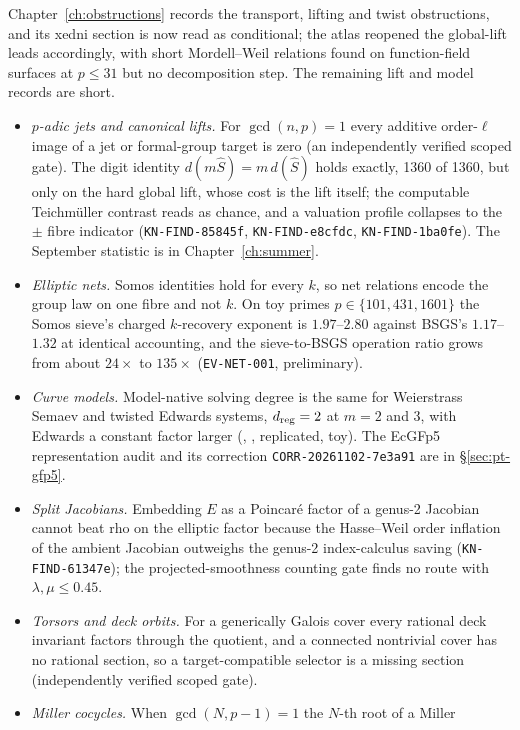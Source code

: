 Chapter~\ref{ch:obstructions} records the transport, lifting and twist
obstructions, and its xedni section is now read as conditional; the atlas
reopened the global-lift leads accordingly, with short Mordell--Weil
relations found on function-field surfaces at $p\le31$ but no decomposition
step. The remaining lift and model records are short.
\begin{itemize}
\item \emph{$p$-adic jets and canonical lifts.} For $\gcd(n,p)=1$ every additive
  order-$\ell$ image of a jet or formal-group target is zero (an independently
  verified scoped gate). The digit identity $d(m\hat S)=m\,d(\hat S)$ holds exactly,
  1360 of 1360, but only on the hard global lift, whose cost is the lift itself;
  the computable Teichm\"uller contrast reads as chance, and a valuation profile
  collapses to the $\pm$ fibre indicator (\texttt{KN-FIND-85845f},
  \texttt{KN-FIND-e8cfdc}, \texttt{KN-FIND-1ba0fe}). The September statistic is in
  Chapter~\ref{ch:summer}.
\item \emph{Elliptic nets.} Somos identities hold for every $k$, so net
  relations encode the group law on one fibre and not $k$. On toy primes
  $p\in\{101,431,1601\}$ the Somos sieve's charged $k$-recovery exponent is
  $1.97$--$2.80$ against BSGS's $1.17$--$1.32$ at identical accounting, and the
  sieve-to-BSGS operation ratio grows from about $24\times$ to $135\times$
  (\texttt{EV-NET-001}, preliminary).
\item \emph{Curve models.} Model-native solving degree is the same for
  Weierstrass Semaev and twisted Edwards systems, $d_{\rm reg}=2$ at $m=2$ and 3,
  with Edwards a constant factor larger (,
  , replicated, toy). The EcGFp5 representation audit and
  its correction \texttt{CORR-20261102-7e3a91} are in \S\ref{sec:pt-gfp5}.
\item \emph{Split Jacobians.} Embedding $E$ as a Poincar\'e factor of a genus-2
  Jacobian cannot beat rho on the elliptic factor because the Hasse--Weil order
  inflation of the ambient Jacobian outweighs the genus-2 index-calculus saving
  (\texttt{KN-FIND-61347e}); the projected-smoothness counting gate finds no
  route with $\lambda,\mu\le0.45$.
\item \emph{Torsors and deck orbits.} For a generically Galois cover every
  rational deck invariant factors through the quotient, and a connected
  nontrivial cover has no rational section, so a target-compatible selector is
  a missing section (independently verified scoped gate).
\item \emph{Miller cocycles.} When $\gcd(N,p-1)=1$ the $N$-th root of a Miller

\end{itemize}
